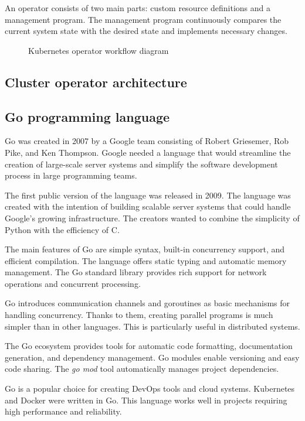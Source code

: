 An operator consists of two main parts: custom resource definitions and a management program.
The management program continuously compares the current system state with the desired state and implements necessary changes.

\begin{figure}[h]



\caption{Kubernetes operator workflow diagram}
\label{fig:kubernetes-operator-flow}
\end{figure}

\subsection{Cluster operator architecture}

\subsection{Go programming language}

Go was created in 2007 by a Google team consisting of Robert Griesemer, Rob Pike, and Ken Thompson.
Google needed a language that would streamline the creation of large-scale server systems and simplify the software development process in large programming teams.

The first public version of the language was released in 2009.
The language was created with the intention of building scalable server systems that could handle Google's growing infrastructure.
The creators wanted to combine the simplicity of Python with the efficiency of C.

The main features of Go are simple syntax, built-in concurrency support, and efficient compilation.
The language offers static typing and automatic memory management.
The Go standard library provides rich support for network operations and concurrent processing.

Go introduces communication channels and goroutines as basic mechanisms for handling concurrency.
Thanks to them, creating parallel programs is much simpler than in other languages.
This is particularly useful in distributed systems.

The Go ecosystem provides tools for automatic code formatting, documentation generation, and dependency management.
Go modules enable versioning and easy code sharing.
The \textit{go mod} tool automatically manages project dependencies.

Go is a popular choice for creating DevOps tools and cloud systems.
Kubernetes and Docker were written in Go. This language works well in projects requiring high performance and reliability.